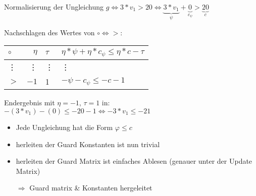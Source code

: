 \begin{frame} %
	\begin{example}
		Normalisierung der Ungleichung $g \Leftrightarrow 3*v_1>20 \Leftrightarrow \underbrace{3*v_1}_{\psi}+\underbrace{0}_{c_\psi} > \underbrace{20}_{c}$\newline
		
		Nachschlagen des Wertes von $\circ \Leftrightarrow >$: 
		\hspace*{1.5cm}
		\begin{tabular}{|l|r|l|l|}
			\hline
			$\circ$ 	& $\eta$ 	& $\tau$ 	&  $ \eta*\psi + \eta*c_{\psi} \le \eta*c-\tau$ \\ 
			\hline \hline
			\vdots 		& \vdots 	&  \vdots 		& \vdots \\ \hline
			$>$ 		& $-1$		&  1 		& $-\psi - c_{\psi} \le -c -1 $ \\ \hline
		\end{tabular} \newline
	
		Endergebnis mit $\eta=-1$, $\tau = 1$ in: \newline
		\hspace*{1.5cm}$-(3*v_1)-(0)\le-20-1 \Leftrightarrow -3*v_1 \le -21$
	\end{example}
\end{frame}

\begin{frame} %
	\begin{itemize}
		\item Jede Ungleichung hat die Form $\varphi \le c$
		\item herleiten der Guard Konstanten ist nun trivial
		\item herleiten der Guard Matrix ist einfaches Ablesen
		\hspace*{1.5cm}(genauer unter der Update Matrix)
		\item[$\Rightarrow$] Guard matrix \& Konstanten hergeleitet \checkmark
	\end{itemize}
\end{frame}

